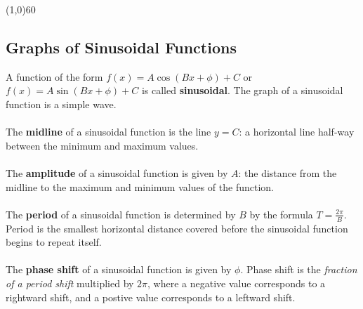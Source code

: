 \documentclass[10.5pt,twoside]{report}
\theoremstyle{definition}
\begin{document}
\line(1,0){60}
\linethickness{0.5mm}

\subsection{Graphs of Sinusoidal Functions}

A function of the form $f(x)=A\cos{(Bx+\phi)+C}$ or $f(x)=A\sin{(Bx+\phi)+C}$ is called \textbf{sinusoidal}.  The graph of a sinusoidal function is a simple wave.\\
${}$\\
The \textbf{midline} of a sinusoidal function is the line $y=C$: a horizontal line half-way between the minimum and maximum values.  \\
${}$\\
The \textbf{amplitude} of a sinusoidal function is given by $A$:  the distance from the midline to the maximum and minimum values of the function.\\
${}$\\
The \textbf{period} of a sinusoidal function is determined by $B$ by the formula $T=\frac{2\pi}{B}$. Period is the smallest horizontal distance covered before the sinusoidal function begins to repeat itself.\\
${}$\\
The \textbf{phase shift} of a sinusoidal function is given by $\phi$.  Phase shift is the \textit{fraction of a period shift} multiplied by $2\pi$, where a negative value corresponds to a rightward shift, and a postive value corresponds to a leftward shift.\\
${}$\\
\end{document}
